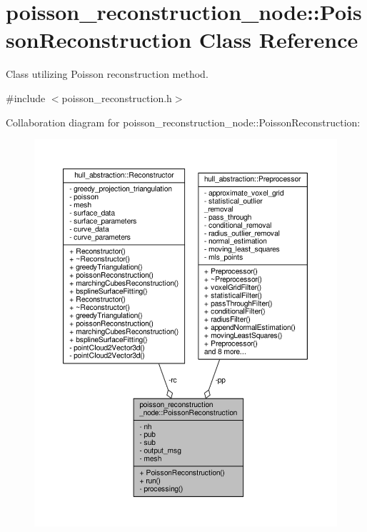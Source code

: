 \hypertarget{classpoisson__reconstruction__node_1_1_poisson_reconstruction}{}\section{poisson\+\_\+reconstruction\+\_\+node\+:\+:Poisson\+Reconstruction Class Reference}
\label{classpoisson__reconstruction__node_1_1_poisson_reconstruction}


Class utilizing Poisson reconstruction method.  




{\ttfamily \#include $<$poisson\+\_\+reconstruction.\+h$>$}



Collaboration diagram for poisson\+\_\+reconstruction\+\_\+node\+:\+:Poisson\+Reconstruction\+:\nopagebreak
\begin{figure}[H]
\begin{center}
\leavevmode
\includegraphics[width=350pt]{classpoisson__reconstruction__node_1_1_poisson_reconstruction__coll__graph}
\end{center}
\end{figure}
